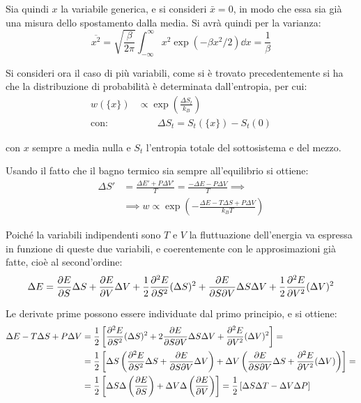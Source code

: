 Sia quindi $x$ la variabile generica, e si consideri $\bar{x} = 0$, in modo che essa sia già una misura dello spostamento dalla media. Si avrà quindi per la varianza:
\begin{equation*}
\overline{x^2} = \sqrt{\frac{\beta}{2\pi}} \int_{-\infty}^\infty x^2 \exp (-\beta x^2 /2) \dd x = \frac{1}{\beta}
\end{equation*}

Si consideri ora il caso di più variabili, come si è trovato precedentemente si ha che la distribuzione di probabilità è determinata dall'entropia, per cui:
\begin{align*}
w(\{x\}) &\propto \exp  \left(\frac{\Delta S_t}{k_B} \right) \\
\text{con:} &\qquad \Delta S_t = S_t(\{x\}) - S_t(0)
\end{align*}

\noindent con $x$ sempre a media nulla e $S_t$ l'entropia totale del sottosistema e del mezzo. 

Usando il fatto che il bagno termico sia sempre all'equilibrio si ottiene:
\begin{align*}
\Delta S' &= \frac{\Delta E' + P \Delta V'}{T} = \frac{- \Delta E - P \Delta V}{T} \implies\\
&\implies w \propto \exp \left( - \frac{\Delta E - T \Delta S + P \Delta V}{k_B T}\right)
\end{align*}

Poiché la variabili indipendenti sono $T$ e $V$ la fluttuazione dell'energia va espressa in funzione di queste due variabili, e coerentemente con le approsimazioni già fatte, cioè al second'ordine:
\begin{equation*}
\Delta E = \frac{\partial {E}}{\partial {S}} \Delta S + \frac{\partial {E}}{\partial {V}} \Delta V + \frac{1}{2} \frac{\partial {^2 E}}{\partial {S^2}} (\Delta S)^2 + \frac{\partial {E}}{\partial {S \partial V}} \Delta S \Delta V + \frac{1}{2} \frac{\partial {^2 E}}{\partial {V^2}} (\Delta V)^2
\end{equation*}

\noindent Le derivate prime possono essere individuate dal primo principio, e si ottiene:
\begin{align*}
\Delta E - T \Delta S + P \Delta V &= \frac{1}{2} \left[\frac{\partial {^2 E}}{\partial {S^2}} (\Delta S)^2 + 2 \frac{\partial {E}}{\partial {S \partial V}} \Delta S \Delta V + \frac{\partial {^2 E}}{\partial {V^2}} (\Delta V)^2\right] =\\
&=\frac{1}{2} \left[\Delta S \left(\frac{\partial {^2 E}}{\partial {S^2}} \Delta S + \frac{\partial {E}}{\partial {S \partial V}} \Delta V\right) + \Delta V  \left(\frac{\partial {E}}{\partial {S \partial V}} \Delta S + \frac{\partial {^2 E}}{\partial {V^2}} (\Delta V)\right)\right] =\\
&= \frac{1}{2} \left[\Delta S \Delta \left(\frac{\partial {E}}{\partial {S}}\right) + \Delta V \Delta \left(\frac{\partial {E}}{\partial {V}}\right)\right] = \frac{1}{2} \left[\Delta S \Delta T - \Delta V \Delta P\right]
\end{align*}

